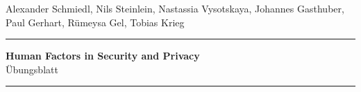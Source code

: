 \begin{scriptsize}
\noindent Alexander Schmiedl, Nils Steinlein, Nastassia Vysotskaya, Johannes Gasthuber, Paul Gerhart, Rümeysa Gel, Tobias Krieg\\[3pt]
\end{scriptsize}
\rule{1.01\textwidth}{0.5pt}
\begin{center}
\sffamily\vspace{-4pt}
\textbf{\Large Human Factors in Security and Privacy}\\[6pt]
{Übungsblatt \Uebungsblatt}\vspace{-8pt}
\rule{1.01\textwidth}{0.5pt}
\end{center}
